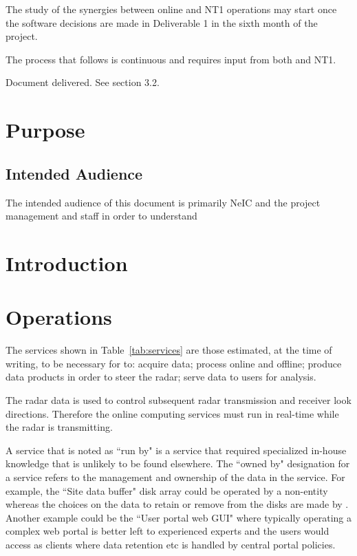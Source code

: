 \documentclass[12pt,a4paper]{article}
\begin{document}
The study of the synergies between \ED online and NT1 operations may start once the software decisions are made in Deliverable 1 in the sixth month of the project.

The process that follows is continuous and requires input from both \ED and NT1.

Document delivered. See section 3.2.

\section{Purpose}
\label{purpose}

\subsection{Intended Audience}

The intended audience of this document is primarily NeIC and the \ED project management and staff in order to understand 

\section{Introduction}
\label{intro}

\newlength{\mycolwidth}
\setlength{\mycolwidth}{3.0cm}


% 

\section{\ED Operations}

The services shown in Table~\ref{tab:services} are those estimated, at the time of writing, to be necessary for \ED to: acquire data; process online and offline; produce data products in order to steer the radar; serve data to users for analysis.

The radar data is used to control subsequent radar transmission and receiver look directions.
Therefore the online computing services must run in real-time while the radar is transmitting.

A service that is noted as ``run by" \EC is a service that required specialized in-house knowledge that is unlikely to be found elsewhere.
The ``owned by" designation for a service refers to the management and ownership of the data in the service.
For example, the ``Site data buffer" disk array could be operated by a non-\EC entity whereas the choices on the data to retain or remove from the disks are made by \EC.
Another example could be the ``User portal web GUI" where typically operating a complex web portal is better left to experienced experts and the \EC users would access as clients where data retention etc is handled by central portal policies.
\end{document}
